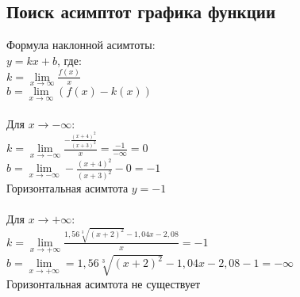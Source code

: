 \documentclass{article}
\begin{document}
    \subsection{Поиск асимптот графика функции}
    Формула наклонной асимтоты: \\
    $y = kx + b$, где: \\
    $k = \lim\limits_{x \to \infty} \frac{f(x)}{x}$ \\
    $b = \lim\limits_{x \to \infty} (f(x) -k(x))$ \\ \\
    Для $x \to - \infty$: \\ 
    $k = \lim\limits_{x \to - \infty} \frac{- \frac{(x+4)^2}{(x+3)^2}}{x} = \frac{-1}{- \infty} = 0$ \\
    $b = \lim\limits_{x \to - \infty} - \frac{(x+4)^2}{(x+3)^2} - 0 = -1$ \\
    Горизонтальная асимтота $y = -1$ \\ \\
    Для $x \to + \infty$: \\
    $k = \lim\limits_{x \to + \infty} \frac{1,56 \sqrt[3]{(x+2)^2} - 1,04 x - 2,08}{x} = -1$ \\
    $b = \lim\limits_{x \to + \infty} = 1,56 \sqrt[3]{(x+2)^2} - 1,04 x - 2,08 - 1 = - \infty$ \\
    Горизонтальная асимтота не существует
    
\end{document}
